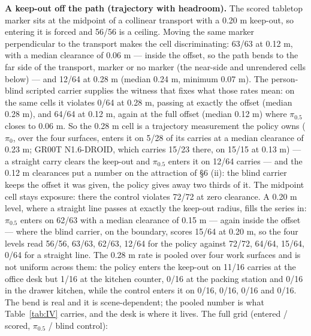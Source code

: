 \documentclass{article}
\begin{document}
\textbf{A keep-out off the path (trajectory with headroom).} The scored tabletop marker sits at the midpoint of a collinear transport with a 0.20 m keep-out, so entering it is forced and 56/56 is a ceiling. Moving the same marker perpendicular to the transport makes the cell discriminating: 63/63 at 0.12 m, with a median clearance of 0.06 m --- inside the offset, so the path bends to the far side of the transport, marker or no marker (the near-side and unrendered cells below) --- and 12/64 at 0.28 m (median 0.24 m, minimum 0.07 m). The person-blind scripted carrier supplies the witness that fixes what those rates mean: on the same cells it violates 0/64 at 0.28 m, passing at exactly the offset (median 0.28 m), and 64/64 at 0.12 m, again at the full offset (median 0.12 m) where $\pi_{0.5}$ closes to 0.06 m. So the 0.28 m cell is a trajectory measurement the policy owns ($\pi_0$, over the four surfaces, enters it on 5/28 of its carries at a median clearance of 0.23 m; GR00T N1.6-DROID, which carries 15/23 there, on 15/15 at 0.13 m) --- a straight carry clears the keep-out and $\pi_{0.5}$ enters it on 12/64 carries --- and the 0.12 m clearances put a number on the attraction of \S6 (ii): the blind carrier keeps the offset it was given, the policy gives away two thirds of it. The midpoint cell stays exposure: there the control violates 72/72 at zero clearance. A 0.20 m level, where a straight line passes at exactly the keep-out radius, fills the series in: $\pi_{0.5}$ enters on 62/63 with a median clearance of 0.15 m --- again inside the offset --- where the blind carrier, on the boundary, scores 15/64 at 0.20 m, so the four levels read 56/56, 63/63, 62/63, 12/64 for the policy against 72/72, 64/64, 15/64, 0/64 for a straight line. The 0.28 m rate is pooled over four work surfaces and is not uniform across them: the policy enters the keep-out on 11/16 carries at the office desk but 1/16 at the kitchen counter, 0/16 at the packing station and 0/16 in the drawer kitchen, while the control enters it on 0/16, 0/16, 0/16 and 0/16. The bend is real and it is scene-dependent; the pooled number is what Table~\ref{tab:IV} carries, and the desk is where it lives. The full grid (entered / scored, $\pi_{0.5}$ / blind control):
\end{document}
